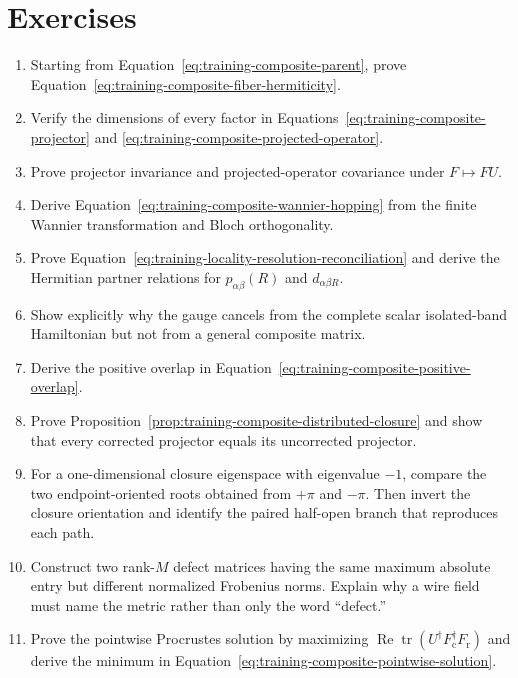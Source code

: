 \section{Exercises}

\begin{enumerate}
  \item Starting from Equation~\eqref{eq:training-composite-parent}, prove
        Equation~\eqref{eq:training-composite-fiber-hermiticity}.
  \item Verify the dimensions of every factor in
        Equations~\eqref{eq:training-composite-projector} and
        \eqref{eq:training-composite-projected-operator}.
  \item Prove projector invariance and projected-operator covariance under
        $F\mapsto FU$.
  \item Derive Equation~\eqref{eq:training-composite-wannier-hopping} from the
        finite Wannier transformation and Bloch orthogonality.
  \item Prove Equation~\eqref{eq:training-locality-resolution-reconciliation}
        and derive the Hermitian partner relations for
        $p_{\alpha\beta}(R)$ and $d_{\alpha\beta R}$.
  \item Show explicitly why the gauge cancels from the complete scalar
        isolated-band Hamiltonian but not from a general composite matrix.
  \item Derive the positive overlap in
        Equation~\eqref{eq:training-composite-positive-overlap}.
  \item Prove Proposition~\ref{prop:training-composite-distributed-closure}
        and show that every corrected projector equals its uncorrected
        projector.
  \item For a one-dimensional closure eigenspace with eigenvalue $-1$, compare
        the two endpoint-oriented roots obtained from $+\pi$ and $-\pi$.
        Then invert the closure orientation and identify the paired half-open
        branch that reproduces each path.
  \item Construct two rank-$M$ defect matrices having the same maximum
        absolute entry but different normalized Frobenius norms. Explain why
        a wire field must name the metric rather than only the word
        ``defect.''
  \item Prove the pointwise Procrustes solution by maximizing
        $\operatorname{Re}\operatorname{tr}(U^{\dagger}F_{\mathrm c}^{\dagger}F_{\mathrm r})$
        and derive the minimum in
        Equation~\eqref{eq:training-composite-pointwise-solution}.

\end{enumerate}
